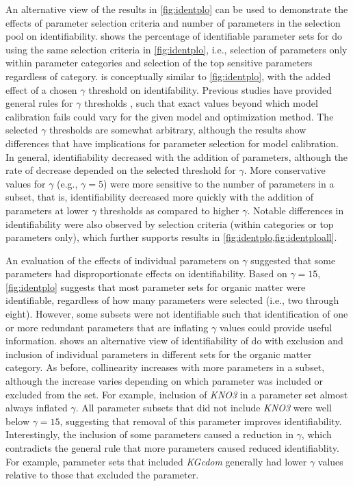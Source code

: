 \documentclass[letterpaper,12pt,oneside]{article}\usepackage[]{graphicx}\usepackage[]{color}
\begin{document}
An alternative view of the results in \cref{fig:identplo} can be used to demonstrate the effects of parameter selection criteria and number of parameters in the selection pool on identifiability.   shows the percentage of identifiable parameter sets for \ac{do} using the same selection criteria in \cref{fig:identplo}, i.e., selection of parameters only within parameter categories and selection of the top sensitive parameters regardless of category.   is conceptually similar to \cref{fig:identplo}, with the added effect of a chosen $\gamma$ threshold on identifability.  Previous studies have provided general rules for $\gamma$ thresholds \citep{Brun01,Omlin01}, such that exact values beyond which model calibration fails could vary for the given model and optimization method.  The selected $\gamma$ thresholds are somewhat arbitrary, although the results show differences that have implications for parameter selection for model calibration.  In general, identifiability decreased with the addition of parameters, although the rate of decrease depended on the selected threshold for $\gamma$. More conservative values for $\gamma$ (e.g., $\gamma = 5$) were more sensitive to the number of parameters in a subset, that is, identifiability decreased more quickly with the addition of parameters at lower $\gamma$ thresholds as compared to higher $\gamma$.  Notable differences in identifiability were also observed by selection criteria (within categories or top parameters only), which further supports results in \cref{fig:identplo,fig:identploall}.    



An evaluation of the effects of individual parameters on $\gamma$ suggested that some parameters had disproportionate effects on identifiability.  Based on $\gamma = 15$, \cref{fig:identplo} suggests that most parameter sets for organic matter were identifiable, regardless of how many parameters were selected (i.e., two through eight).  However, some subsets were not identifiable such that identification of one or more redundant parameters that are inflating $\gamma$ values could provide useful information.   shows an alternative view of identifiability of \ac{do} with exclusion and inclusion of individual parameters in different sets for the organic matter category.  As before, collinearity increases with more parameters in a subset, although the increase varies depending on which parameter was included or excluded from the set.  For example, inclusion of \textit{KNO3} in a parameter set almost always inflated $\gamma$.  All parameter subsets that did not include \textit{KNO3} were well below $\gamma = 15$, suggesting that removal of this parameter improves identifiability.  Interestingly, the inclusion of some parameters caused a reduction in $\gamma$, which contradicts the general rule that more parameters caused reduced identifiablity.  For example, parameter sets that included \textit{KGcdom} generally had lower $\gamma$ values relative to those that excluded the parameter.
\end{document}
